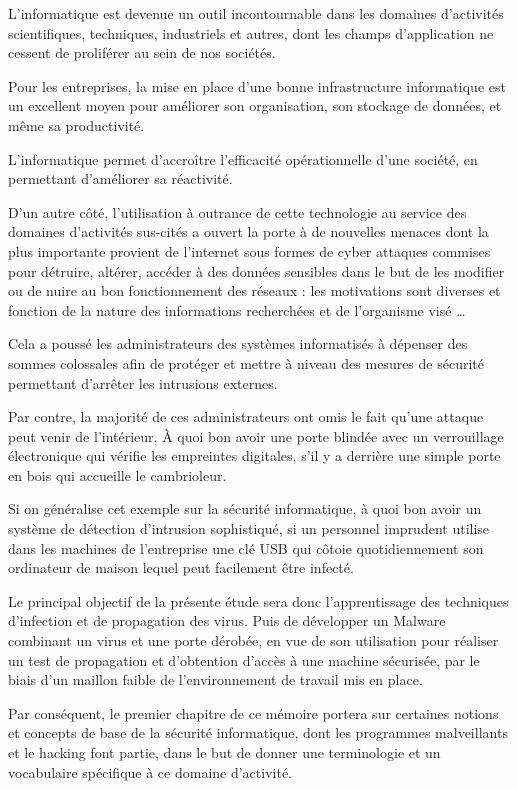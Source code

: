 
L’informatique est devenue un outil incontournable dans les domaines d’activités scientifiques, techniques, industriels et autres, dont les champs d’application ne cessent de proliférer au sein de nos sociétés.

Pour les entreprises, la mise en place d’une bonne infrastructure informatique est un excellent moyen pour améliorer son organisation, son stockage de données, et même sa productivité. 

L’informatique permet  d’accroître l’efficacité opérationnelle d’une société, en permettant d’améliorer sa réactivité.

D’un autre côté, l’utilisation à outrance de cette technologie au service des domaines d’activités sus-cités a 
ouvert la porte à de nouvelles menaces dont la plus importante provient de l’internet sous formes de cyber 
attaques commises pour détruire, altérer, accéder à des données sensibles dans le but de les modifier ou de nuire au 
bon fonctionnement des réseaux : les motivations sont diverses et fonction de la nature des informations recherchées 
et de l’organisme visé \ldots

Cela a poussé les administrateurs des systèmes informatisés à dépenser des sommes colossales afin de protéger et mettre 
à niveau des mesures de sécurité permettant d’arrêter les intrusions externes.

Par contre, la majorité de ces administrateurs ont omis le fait qu’une attaque peut venir de l’intérieur. 
À quoi bon avoir une porte blindée avec un verrouillage électronique qui vérifie les empreintes digitales, 
s'il y a derrière une simple porte en bois qui accueille le cambrioleur. 

Si on généralise cet exemple sur la sécurité informatique, à quoi bon avoir un système de détection d’intrusion 
sophistiqué, si un personnel imprudent utilise dans les machines de l'entreprise une clé USB qui côtoie 
quotidiennement son ordinateur de maison lequel peut facilement être infecté.

Le principal objectif de la présente étude sera donc l'apprentissage des techniques d'infection et de propagation 
des virus. Puis de développer un Malware combinant un virus et une porte dérobée, en vue de son utilisation pour 
réaliser un test de propagation et d'obtention d'accès  à une machine sécurisée, par le biais d'un maillon 
faible de l'environnement  de travail mis en place.

Par conséquent, le premier chapitre de ce mémoire portera sur certaines notions et concepts de base de la 
sécurité informatique, dont les programmes malveillants et le hacking font partie, dans le but de donner une 
terminologie et un vocabulaire spécifique à ce domaine d’activité.

